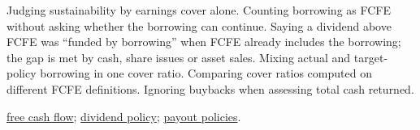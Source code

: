 \begin{qfmethod}
 Judging sustainability by earnings cover alone. Counting borrowing as FCFE without asking whether the borrowing can continue. Saying a dividend above FCFE was ``funded by borrowing'' when FCFE already includes the borrowing; the gap is met by cash, share issues or asset sales. Mixing actual and target-policy borrowing in one cover ratio. Comparing cover ratios computed on different FCFE definitions. Ignoring buybacks when assessing total cash returned.

 \hyperref[meth:free-cash-flow-coverage]{free cash flow}; \hyperref[meth:dividend-policy-evaluation]{dividend policy}; \hyperref[meth:payout-policy-comparison]{payout policies}.

\end{qfmethod}
